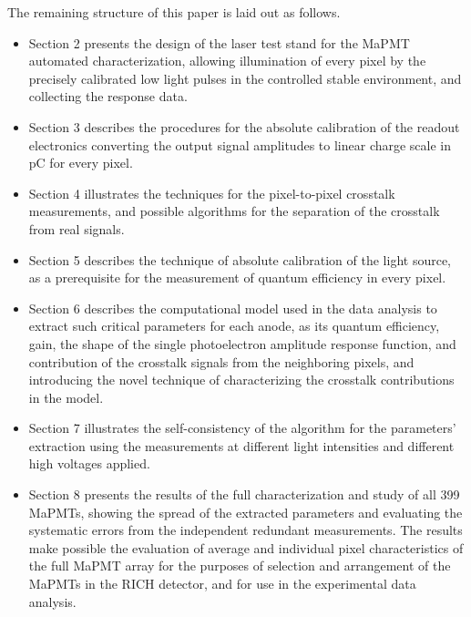 The remaining structure of this paper is laid out as follows. 
\begin{itemize}
	\item Section 2 presents the design of the laser test stand for the MaPMT automated characterization, allowing illumination of every pixel by the precisely calibrated low light pulses in the controlled stable environment, and collecting the response data. 
	\item Section 3 describes the procedures for the absolute calibration of the readout electronics converting the output signal amplitudes to linear charge scale in pC for every pixel. 
	\item Section 4 illustrates the techniques for the pixel-to-pixel crosstalk measurements, and possible algorithms for the separation of the crosstalk from real signals. 
	\item Section 5 describes the technique of absolute calibration of the light source, as a prerequisite for the measurement of quantum efficiency in every pixel. 
	\item Section 6 describes the computational model used in the data analysis to extract such critical parameters for each anode, as its quantum efficiency, gain, the shape of the single photoelectron amplitude response function, and contribution of the crosstalk signals from the neighboring pixels, and introducing the novel technique of characterizing the crosstalk contributions in the model. 
	\item Section 7 illustrates the self-consistency of the algorithm for the parameters' extraction using the measurements at different light intensities and different high voltages applied. 
	\item Section 8 presents the results of the full characterization and study of all 399 MaPMTs, showing the spread of the extracted parameters and evaluating the systematic errors from the independent redundant measurements. The results make possible the evaluation of average and individual pixel characteristics of the full MaPMT array for the purposes of selection and arrangement of the MaPMTs in the RICH detector, and for use in the experimental data analysis.
\end{itemize}

